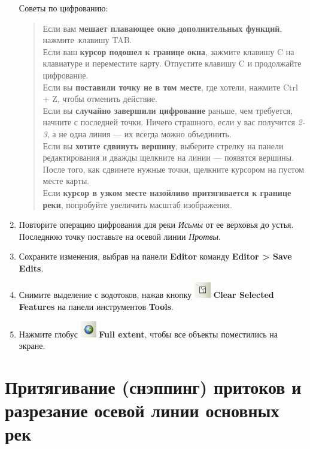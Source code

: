 \documentclass[]{book}
\theoremstyle{definition}
\theoremstyle{definition}
\theoremstyle{definition}
\theoremstyle{remark}
\begin{document}
\begin{enumerate}
  Советы по цифрованию:

  \begin{quote}
  Если вам \textbf{мешает плавающее окно дополнительных функций},
  нажмите~клавишу TAB.\\
  Если ваш \textbf{курсор подошел к границе окна}, зажмите клавишу C на
  клавиатуре и переместите карту. Отпустите клавишу C и продолжайте
  цифрование.\\
  Если вы \textbf{поставили точку не в том месте}, где хотели, нажмите
  Ctrl + Z, чтобы отменить действие.\\
  Если вы \textbf{случайно завершили цифрование} раньше, чем требуется,
  начните с последней точки. Ничего страшного, если у вас получится
  \emph{2-3}, а не одна линия --- их всегда можно объединить.\\
  Если вы \textbf{хотите сдвинуть вершину}, выберите стрелку на панели
  редактирования и дважды щелкните на линии --- появятся вершины. После
  того, как сдвинете нужные точки, щелкните курсором на пустом месте
  карты.\\
  Если \textbf{курсор в узком месте назойливо притягивается к границе
  реки}, попробуйте увеличить масштаб изображения.
  \end{quote}
\item
  Повторите операцию цифрования для реки \emph{Исьмы} от ее верховья до
  устья. Последнюю точку поставьте на осевой линии \emph{Протвы}.
\item
  Сохраните изменения, выбрав на панели \textbf{Editor} команду
  \textbf{Editor \textgreater{} Save Edits}.
\item
  Снимите выделение с водотоков, нажав кнопку
  \includegraphics{images/Ex13/image10.png} \textbf{Clear Selected
  Features} на панели инструментов \textbf{Tools}.
\item
  Нажмите глобус \includegraphics{images/Ex13/image14.png} \textbf{Full
  extent}, чтобы все объекты поместились на экране.
\end{enumerate}

\hypertarget{--------}{%
\section{Притягивание (снэппинг) притоков и разрезание осевой линии
основных рек}\label{--------}}
\end{document}
